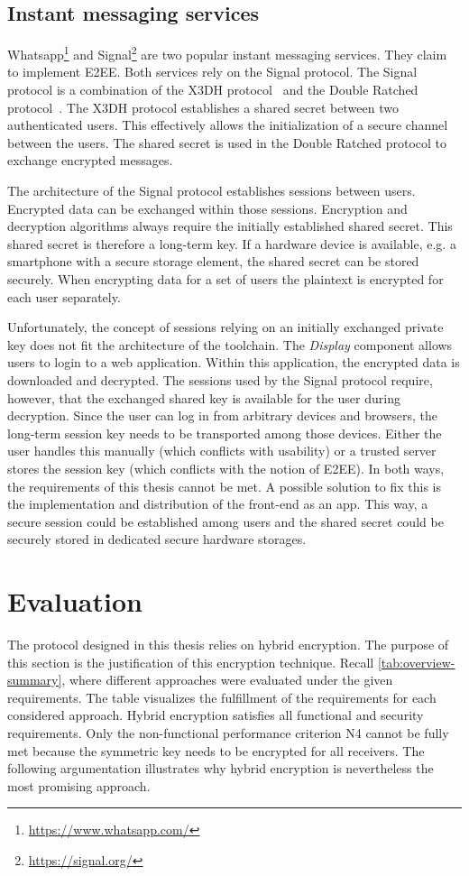 \documentclass[../main.tex]{subfiles}
\begin{document}
\subsection{Instant messaging services}
Whatsapp\footnote{\url{https://www.whatsapp.com/}} and Signal\footnote{\url{https://signal.org/}} are two popular instant messaging services.
They claim to implement E2EE.
Both services rely on the Signal protocol.
The Signal protocol is a combination of the X3DH protocol~\cite{Marlinspike2016} and the Double Ratched protocol~\cite{Perrin2016}.
The X3DH protocol establishes a shared secret between two authenticated users.
This effectively allows the initialization of a secure channel between the users.
The shared secret is used in the Double Ratched protocol to exchange encrypted messages.~\cite{Marlinspike2016, Perrin2016}

The architecture of the Signal protocol establishes sessions between users.
Encrypted data can be exchanged within those sessions.
Encryption and decryption algorithms always require the initially established shared secret.
This shared secret is therefore a long-term key.
If a hardware device is available, e.g. a smartphone with a secure storage element, the shared secret can be stored securely. 
When encrypting data for a set of users the plaintext is encrypted for each user separately.~\cite{Marlinspike2014}

Unfortunately, the concept of sessions relying on an initially exchanged private key does not fit the architecture of the toolchain.
The \emph{Display} component allows users to login to a web application.
Within this application, the encrypted data is downloaded and decrypted.
The sessions used by the Signal protocol require, however, that the exchanged shared key is available for the user during decryption.
Since the user can log in from arbitrary devices and browsers, the long-term session key needs to be transported among those devices.
Either the user handles this manually (which conflicts with usability) or a trusted server stores the session key (which conflicts with the notion of E2EE).
In both ways, the requirements of this thesis cannot be met.
A possible solution to fix this is the implementation and distribution of the front-end as an app.
This way, a secure session could be established among users and the shared secret could be securely stored in dedicated secure hardware storages.

\section{Evaluation}
\label{sec:justification}
The protocol designed in this thesis relies on hybrid encryption.
The purpose of this section is the justification of this encryption technique.
Recall \cref{tab:overview-summary}, where different approaches were evaluated under the given requirements.
The table visualizes the fulfillment of the requirements for each considered approach.
Hybrid encryption satisfies all functional and security requirements.
Only the non-functional performance criterion N4 cannot be fully met because the symmetric key needs to be encrypted for all receivers.
The following argumentation illustrates why hybrid encryption is nevertheless the most promising approach.
\end{document}
